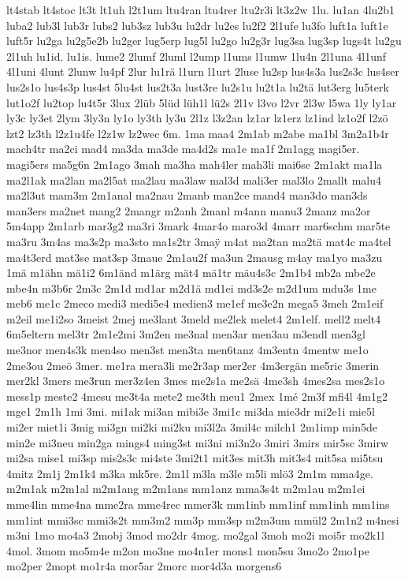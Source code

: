 {lt4stab
lt4stoc
lt3t
lt1uh
l2t1um
ltu4ran
ltu4rer
ltu2r3i
lt3z2w
1lu.
lu1an
4lu2b1
luba2
lub3l
lub3r
lubs2
lub3sz
lub3u
lu2dr
lu2es
lu2f2
2l1ufe
lu3fo
luft1a
luft1e
luft5r
lu2ga
lu2g5e2b
lu2ger
lug5erp
lug5l
lu2go
lu2g3r
lug3sa
lug3sp
lugs4t
lu2gu
2l1uh
lu1id.
lu1is.
lume2
2lumf
2luml
l2ump
l1ums
l1umw
1lu4n
2l1una
4l1unf
4l1uni
4lunt
2lunw
lu4pf
2lur
lu1rä
l1urn
l1urt
2luse
lu2sp
lus4s3a
lus2s3c
lus4ser
lus2s1o
lus4s3p
lus4st
5lu4st
lus2t3a
lust3re
lu2s1u
lu2t1a
lu2tä
lut3erg
lu5terk
lut1o2f
lu2top
lu4t5r
3lux
2lüb
5lüd
lüh1l
lü2s
2l1v
l3vo
l2vr
2l3w
l5wa
1ly
ly1ar
ly3c
ly3et
2lym
3ly3n
ly1o
ly3th
ly3u
2l1z
l3z2an
lz1ar
lz1erz
lz1ind
lz1o2f
l2zö
lzt2
lz3th
l2z1u4fe
l2z1w
lz2wec
6m.
1ma
maa4
2m1ab
m2abe
ma1bl
3m2a1b4r
mach4tr
ma2ci
mad4
ma3da
ma3de
ma4d2s
ma1e
ma1f
2m1agg
magi5er.
magi5ers
ma5g6n
2m1ago
3mah
ma3ha
mah4ler
mah3li
mai6se
2m1akt
ma1la
ma2l1ak
ma2lan
ma2l5at
ma2lau
ma3law
mal3d
mali3er
mal3lo
2mallt
malu4
ma2l3ut
mam3m
2m1anal
ma2nau
2manb
man2ce
mand4
man3do
man3ds
man3ers
ma2net
mang2
2mangr
m2anh
2manl
m4ann
manu3
2manz
ma2or
5m4app
2m1arb
mar3g2
ma3ri
3mark
4mar4o
maro3d
4marr
mar6schm
mar5te
ma3ru
3m4as
ma3s2p
ma3sto
ma1s2tr
3ma^^ff
m4at
ma2tan
ma2tä
mat4c
ma4tel
ma4t3erd
mat3se
mat3sp
3maue
2m1au2f
ma3un
2mausg
m4ay
ma1yo
ma3zu
1mä
m1ähn
mä1i2
6m1änd
m1ärg
mät4
mä1tr
mäu4s3c
2m1b4
mb2a
mbe2e
mbe4n
m3b6r
2m3c
2m1d
md1ar
m2d1ä
md1ei
md3s2e
m2d1um
mdu3s
1me
meb6
me1c
2meco
medi3
medi5e4
medien3
me1ef
me3e2n
mega5
3meh
2m1eif
m2eil
me1i2so
3meist
2mej
me3lant
3meld
me2lek
melet4
2m1elf.
mell2
melt4
6m5eltern
mel3tr
2m1e2mi
3m2en
me3nal
men3ar
men3au
m3endl
men3gl
me3nor
men4s3k
men4so
men3st
men3ta
men6tanz
4m3entn
4mentw
me1o
2me3ou
2meö
3mer.
me1ra
mera3li
me2r3ap
mer2er
4m3ergän
me5ric
3merin
mer2kl
3mers
me3run
mer3z4en
3mes
me2s1a
me2sä
4me3sh
4mes2sa
mes2s1o
mess1p
meste2
4mesu
me3t4a
mete2
me3th
meu1
2mex
1mé
2m3f
mfi4l
4m1g2
mge1
2m1h
1mi
3mi.
mi1ak
mi3an
mibi3e
3mi1c
mi3da
mie3dr
mi2e1i
mie5l
mi2er
miet1i
3mig
mi3gn
mi2ki
mi2ku
mi3l2a
3mil4c
milch1
2m1imp
min5de
min2e
mi3neu
min2ga
mings4
ming3st
mi3ni
mi3n2o
3miri
3mirs
mir5sc
3mirw
mi2sa
mise1
mi3sp
mis2s3c
mi4ste
3mi2t1
mit3es
mit3h
mit3s4
mit5sa
mi5tsu
4mitz
2m1j
2m1k4
m3ka
mk5re.
2m1l
m3la
m3le
m5li
mlö3
2m1m
mma4ge.
m2m1ak
m2m1al
m2m1ang
m2m1ans
mm1anz
mma3s4t
m2m1au
m2m1ei
mme4lin
mme4na
mme2ra
mme4rec
mmer3k
mm1inb
mm1inf
mm1inh
mm1ins
mm1int
mmi3sc
mmi3s2t
mm3m2
mm3p
mm3sp
m2m3um
mmül2
2m1n2
m4nesi
m3ni
1mo
mo4a3
2mobj
3mod
mo2dr
4mog.
mo2gal
3moh
mo2i
moi5r
mo2k1l
4mol.
3mom
mo5m4e
m2on
mo3ne
mo4n1er
mons1
mon5su
3mo2o
2mo1pe
mo2per
2mopt
mo1r4a
mor5ar
2morc
mor4d3a
morgens6
}
